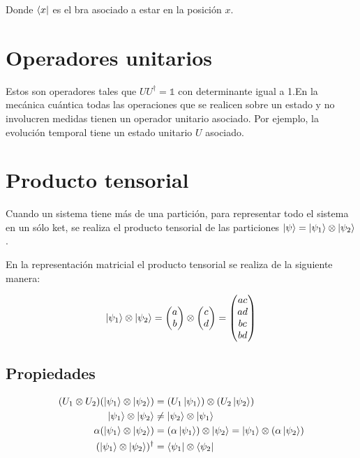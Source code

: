 Donde $\bra{x}$ es el bra asociado a estar en la posición $x$.


\section{Operadores unitarios}

Estos son operadores tales que $U U^\dagger = \mathds{1}$ con determinante igual a 1.En la mecánica cuántica todas las operaciones que se realicen sobre un estado y no involucren medidas tienen un operador unitario asociado. Por ejemplo, la evolución temporal tiene un estado unitario $U$ asociado.

\section{Producto tensorial}

Cuando un sistema tiene más de una partición, para representar todo el sistema en un sólo ket, se realiza el producto tensorial de las particiones $\ket{\psi} = \ket{\psi_1} \otimes \ket{\psi_2}$.

En la representación matricial el producto tensorial se realiza de la siguiente manera:

\begin{equation*}
    \ket{\psi_1} \otimes \ket{\psi_2} =
    \begin{pmatrix}
        a \\
        b
    \end{pmatrix}
    \otimes
    \begin{pmatrix}
        c \\
        d
    \end{pmatrix}
    =
    \begin{pmatrix}
        a c \\
        a d \\
        b c \\
        b d \\
    \end{pmatrix}
\end{equation*}

\subsection{Propiedades}

\begin{align}
    (U_1 \otimes U_2) (\ket{\psi_1} \otimes \ket{\psi_2}) &= (U_1 \ket{\psi_1}) \otimes (U_2 \ket{\psi_2}) \\
    \ket{\psi_1} \otimes \ket{\psi_2} &\neq \ket{\psi_2} \otimes \ket{\psi_1} \\
    \alpha (\ket{\psi_1} \otimes \ket{\psi_2}) &= (\alpha \ket{\psi_1}) \otimes \ket{\psi_2} = \ket{\psi_1} \otimes (\alpha \ket{\psi_2}) \\
    (\ket{\psi_1} \otimes \ket{\psi_2})^\dagger &= \bra{\psi_1} \otimes \bra{\psi_2}
\end{align}

